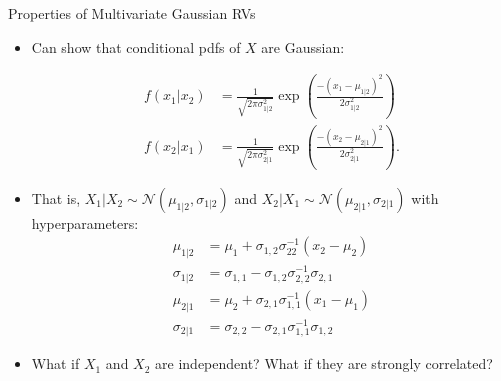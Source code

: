 \documentclass[9pt]{beamer}
\begin{document}
%
\begin{frame}{Properties of Multivariate Gaussian RVs}

\begin{itemize}
\setlength{\itemsep}{10pt}
\item Can show that conditional pdfs of $X$ are Gaussian:
\begin{block}{}
\begin{align*}
f(x_1|x_2)&=\frac{1}{\sqrt{2\pi\sigma_{1|2}^2}}\exp \left({\frac{-(x_1-\mu_{1|2})^2}{2\sigma_{1|2}^2}}\right)\\
f(x_2|x_1)&=\frac{1}{\sqrt{2\pi\sigma_{2|1}^2}}\exp \left({\frac{-(x_2-\mu_{2|1})^2}{2\sigma_{2|1}^2}}\right).
\end{align*} 
\end{block}
\item That is, $X_1|X_2\sim \mathcal{N}(\mu_{1|2},\sigma_{1|2})$ and $X_2|X_1\sim \mathcal{N}(\mu_{2|1},\sigma_{2|1})$ with hyperparameters:
\begin{align*}
\mu_{1|2}&=\mu_1+\sigma_{1,2}\sigma_{22}^{-1}(x_2-\mu_2)\\
\sigma_{1|2}&=\sigma_{1,1}-\sigma_{1,2}\sigma_{2,2}^{-1}\sigma_{2,1}\\
\mu_{2|1}&=\mu_2+\sigma_{2,1}\sigma_{1,1}^{-1}(x_1-\mu_1)\\
\sigma_{2|1}&=\sigma_{2,2}-\sigma_{2,1}\sigma_{1,1}^{-1}\sigma_{1,2}
\end{align*}
\item What  if $X_1$ and $X_2$ are independent? What  if they are strongly correlated?
\end{itemize}

\end{frame}
\end{document}
